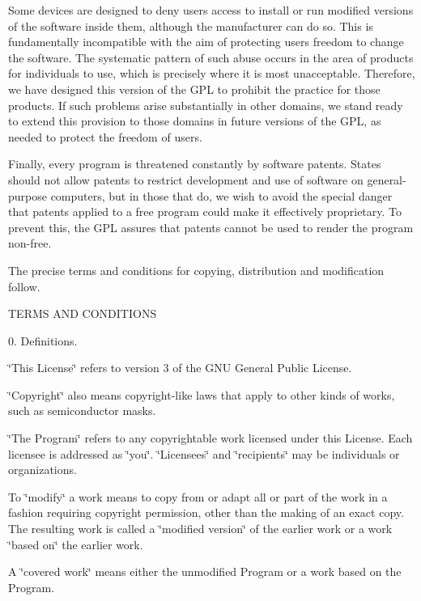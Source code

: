 Some devices are designed to deny users access to install or run modified versions of the software inside them, although the manufacturer can do so. This is fundamentally incompatible with the aim of protecting users\textquotesingle{} freedom to change the software. The systematic pattern of such abuse occurs in the area of products for individuals to use, which is precisely where it is most unacceptable. Therefore, we have designed this version of the G\+PL to prohibit the practice for those products. If such problems arise substantially in other domains, we stand ready to extend this provision to those domains in future versions of the G\+PL, as needed to protect the freedom of users.

Finally, every program is threatened constantly by software patents. States should not allow patents to restrict development and use of software on general-\/purpose computers, but in those that do, we wish to avoid the special danger that patents applied to a free program could make it effectively proprietary. To prevent this, the G\+PL assures that patents cannot be used to render the program non-\/free.

The precise terms and conditions for copying, distribution and modification follow. \begin{DoxyVerb}                   TERMS AND CONDITIONS
\end{DoxyVerb}


0. Definitions.

\char`\"{}\+This License\char`\"{} refers to version 3 of the G\+NU General Public License.

\char`\"{}\+Copyright\char`\"{} also means copyright-\/like laws that apply to other kinds of works, such as semiconductor masks.

\char`\"{}\+The Program\char`\"{} refers to any copyrightable work licensed under this License. Each licensee is addressed as \char`\"{}you\char`\"{}. \char`\"{}\+Licensees\char`\"{} and \char`\"{}recipients\char`\"{} may be individuals or organizations.

To \char`\"{}modify\char`\"{} a work means to copy from or adapt all or part of the work in a fashion requiring copyright permission, other than the making of an exact copy. The resulting work is called a \char`\"{}modified version\char`\"{} of the earlier work or a work \char`\"{}based on\char`\"{} the earlier work.

A \char`\"{}covered work\char`\"{} means either the unmodified Program or a work based on the Program.

